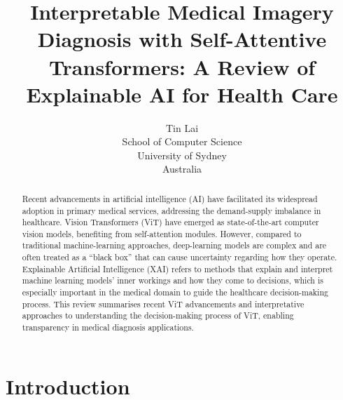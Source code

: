 \documentclass[dvipsnames]{article}
\renewcommand{\cite}[1]{\autocite{#1}}
\begin{document}
\newcommand{\shortheadtitle}{
  A Review of Explainable AI on Self-Attentive VisionTransformer in Health Care
  }


\title{
    Interpretable Medical Imagery Diagnosis with Self-Attentive Transformers:
    A Review of \\ Explainable AI for Health Care
  }

\author{
  Tin Lai\\
  School of Computer Science\\
  University of Sydney\\
  Australia \\
}


\maketitle






\begin{abstract}
Recent advancements in artificial intelligence (AI) have facilitated its widespread adoption in primary medical services, addressing the demand-supply imbalance in healthcare. Vision Transformers (ViT) have emerged as state-of-the-art computer vision models, benefiting from self-attention modules. However, compared to traditional machine-learning approaches, deep-learning models are complex and are often treated as a ``black box'' that can cause uncertainty regarding how they operate. Explainable Artificial Intelligence (XAI) refers to methods that explain and interpret machine learning models' inner workings and how they come to decisions, which is especially important in the medical domain to guide the healthcare decision-making process. This review summarises recent ViT advancements and interpretative approaches to understanding the decision-making process of ViT, enabling transparency in medical diagnosis applications.
\end{abstract}


\robustify\textsuperscript
\global\def\printmytablefootnoteContent{} %
\global\def\mytablefootnotecite#1{%
    \footnotemark
    \ifdefined\lockmytablefootnotecite
    \else
        \xdef\printmytablefootnoteContent{\printmytablefootnoteContent{} {\textsuperscript{\thefootnote}\cite{#1}}~}%
    \fi
}


\section{Introduction}
\end{document}
